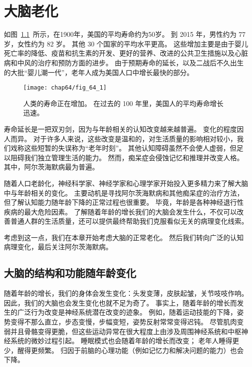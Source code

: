 \chapter{大脑老化} \label{chap:chap64}

如图~\ref{fig:64_1}~所示，在1900年，美国的平均寿命约为50岁。
到 2015 年，男性约为 77 岁，女性约为 82 岁。
其他 30 个国家的平均水平更高。
这些增加主要是由于婴儿死亡率的降低、疫苗和抗生素的开发、更好的营养、改进的公共卫生措施以及心脏病和中风的治疗和预防方面的进步。
由于预期寿命的延长，以及二战后不久出生的大批“婴儿潮一代”，老年人成为美国人口中增长最快的部分。


\begin{figure}[htbp]
	\centering
	\texttt{[image: chap64/fig\_64\_1]}
	\caption{人类的寿命正在增加。
		在过去的 100 年里，美国人的平均寿命增长迅速\cite{strehler1975implications,arias2007united}。}
	\label{fig:64_1}
\end{figure}


寿命延长是一把双刃剑，因为与年龄相关的认知改变越来越普遍。
变化的程度因人而异。
对于许多人来说，这些改变是温和的，对生活质量的影响相对较小，我们戏称这些短暂的失误称为“老年时刻”。
其他认知障碍虽然不会使人虚弱，但足以阻碍我们独立管理生活的能力。
然而，痴呆症会侵蚀记忆和推理并改变人格。
其中，阿尔茨海默病最为普遍。


随着人口老龄化，神经科学家、神经学家和心理学家开始投入更多精力来了解大脑中与年龄相关的变化。
主要动机是寻找阿尔茨海默病和其他痴呆症的治疗方法，但了解认知能力随年龄下降的正常过程也很重要。
毕竟，年龄是各种神经退行性疾病的最大危险因素。
了解随着年龄的增长我们的大脑会发生什么，不仅可以改善普通人群的生活质量，还可以提供最终帮助我们克服看似无关的病理变化线索。


考虑到这一点，我们在本章开始考虑大脑的正常老化。
然后我们转向广泛的认知病理变化，最后关注阿尔茨海默病。



\section{大脑的结构和功能随年龄变化}

随着年龄的增长，我们的身体会发生变化：头发变薄，皮肤起皱，关节吱吱作响。
因此，我们的大脑也会发生变化也就不足为奇了。
事实上，随着年龄的增长而发生的广泛行为改变是神经系统潜在改变的迹象。
例如，随着运动技能的下降，姿势变得不那么直立，步态变慢，步幅变短，姿势反射常常变得迟钝。
尽管肌肉变弱并且骨骼变得更脆，但这些运动异常在很大程度上由涉及周围神经系统和中枢神经系统的微妙过程引起。
睡眠模式也会随着年龄的增长而改变；
老年人睡得更少，醒得更频繁。
归因于前脑的心理功能（例如记忆力和解决问题的能力）也会下降。


